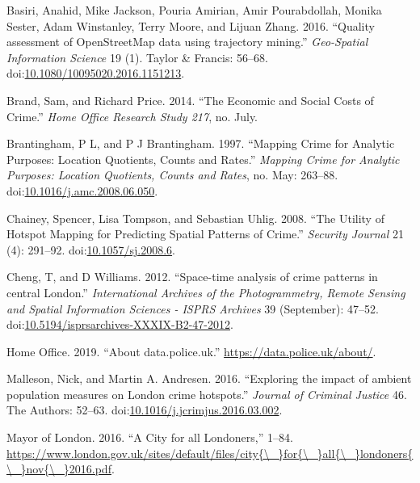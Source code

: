 \documentclass[]{article}
\theoremstyle{definition}
\theoremstyle{definition}
\theoremstyle{definition}
\theoremstyle{remark}
\begin{document}
\hypertarget{ref-Basiri2016}{}
Basiri, Anahid, Mike Jackson, Pouria Amirian, Amir Pourabdollah, Monika
Sester, Adam Winstanley, Terry Moore, and Lijuan Zhang. 2016. ``Quality
assessment of OpenStreetMap data using trajectory mining.''
\emph{Geo-Spatial Information Science} 19 (1). Taylor \& Francis:
56--68.
doi:\href{https://doi.org/10.1080/10095020.2016.1151213}{10.1080/10095020.2016.1151213}.

\hypertarget{ref-Brand2014}{}
Brand, Sam, and Richard Price. 2014. ``The Economic and Social Costs of
Crime.'' \emph{Home Office Research Study 217}, no. July.

\hypertarget{ref-Brantingham1997}{}
Brantingham, P L, and P J Brantingham. 1997. ``Mapping Crime for
Analytic Purposes: Location Quotients, Counts and Rates.'' \emph{Mapping
Crime for Analytic Purposes: Location Quotients, Counts and Rates}, no.
May: 263--88.
doi:\href{https://doi.org/10.1016/j.amc.2008.06.050}{10.1016/j.amc.2008.06.050}.

\hypertarget{ref-Chainey2008}{}
Chainey, Spencer, Lisa Tompson, and Sebastian Uhlig. 2008. ``The Utility
of Hotspot Mapping for Predicting Spatial Patterns of Crime.''
\emph{Security Journal} 21 (4): 291--92.
doi:\href{https://doi.org/10.1057/sj.2008.6}{10.1057/sj.2008.6}.

\hypertarget{ref-Cheng2012}{}
Cheng, T, and D Williams. 2012. ``Space-time analysis of crime patterns
in central London.'' \emph{International Archives of the Photogrammetry,
Remote Sensing and Spatial Information Sciences - ISPRS Archives} 39
(September): 47--52.
doi:\href{https://doi.org/10.5194/isprsarchives-XXXIX-B2-47-2012}{10.5194/isprsarchives-XXXIX-B2-47-2012}.

\hypertarget{ref-Office2019}{}
Home Office. 2019. ``About data.police.uk.''
\url{https://data.police.uk/about/}.

\hypertarget{ref-Malleson2016}{}
Malleson, Nick, and Martin A. Andresen. 2016. ``Exploring the impact of
ambient population measures on London crime hotspots.'' \emph{Journal of
Criminal Justice} 46. The Authors: 52--63.
doi:\href{https://doi.org/10.1016/j.jcrimjus.2016.03.002}{10.1016/j.jcrimjus.2016.03.002}.

\hypertarget{ref-MayorofLondon2016}{}
Mayor of London. 2016. ``A City for all Londoners,'' 1--84.
\href{https://www.london.gov.uk/sites/default/files/city\%7B/_\%7Dfor\%7B/_\%7Dall\%7B/_\%7Dlondoners\%7B/_\%7Dnov\%7B/_\%7D2016.pdf}{https://www.london.gov.uk/sites/default/files/city\{\textbackslash{}\_\}for\{\textbackslash{}\_\}all\{\textbackslash{}\_\}londoners\{\textbackslash{}\_\}nov\{\textbackslash{}\_\}2016.pdf}.
\end{document}
